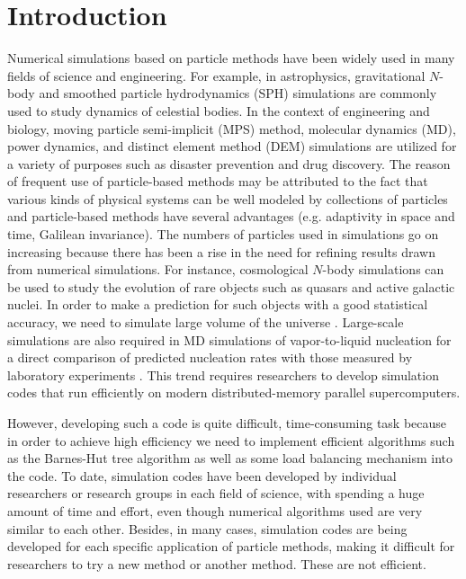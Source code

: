 \documentclass[proof,useamsfonts]{pasj01}
\begin{document}
\section{Introduction}
\label{sec:introduction}
Numerical simulations based on particle methods have been widely used in many fields of science and engineering. For example, in astrophysics, gravitational $N$-body and smoothed particle hydrodynamics (SPH) simulations are commonly used to study dynamics of celestial bodies. In the context of engineering and biology, moving particle semi-implicit (MPS) method, molecular dynamics (MD), power dynamics, and distinct element method (DEM) simulations are utilized for a variety of purposes such as disaster prevention and drug discovery. The reason of frequent use of particle-based methods may be attributed to the fact that various kinds of physical systems can be well modeled by collections of particles and particle-based methods have several advantages (e.g. adaptivity in space and time, Galilean invariance). The numbers of particles used in simulations go on increasing because there has been a rise in the need for refining results drawn from numerical simulations. For instance, cosmological $N$-body simulations can be used to study the evolution of rare objects such as quasars and active galactic nuclei. In order to make a prediction for such objects with a good statistical accuracy, we need to simulate large volume of the universe \citep{ishiyama15:_the_nu2_gc_simulations}. Large-scale simulations are also required in MD simulations of vapor-to-liquid nucleation for a direct comparison of predicted nucleation rates with those measured by laboratory experiments \citep{diemand13:_large_scale_molecular}. This trend requires researchers to develop simulation codes that run efficiently on modern distributed-memory parallel supercomputers.

However, developing such a code is quite difficult, time-consuming task because in order to achieve high efficiency we need to implement efficient algorithms such as the Barnes-Hut tree algorithm \citep{barnes_hut86:_a_hierarchical} as well as some load balancing mechanism into the code. To date, simulation codes have been developed by individual researchers or research groups in each field of science, with spending a huge amount of time and effort, even though numerical algorithms used are very similar to each other. Besides, in many cases, simulation codes are being developed for each specific application of particle methods, making it difficult for researchers to try a new method or another method. These are not efficient. 
\end{document}
